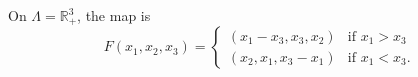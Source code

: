 On $\Lambda=\mathbb{R}^3_+$, the map is
\cite{cassaigne_algorithme_2015}
\[
F (x_1,x_2,x_3) = 
\begin{cases}
    (x_1-x_3, x_3, x_2) & \mbox{if } x_1 > x_3\\
    (x_2, x_1, x_3-x_1) & \mbox{if } x_1 < x_3.
\end{cases}
\]
